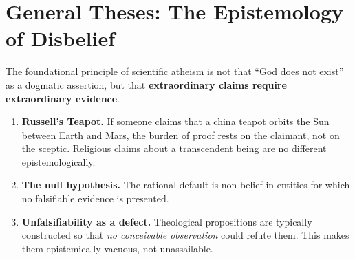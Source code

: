 \documentclass[11pt,twoside]{article}
\begin{document}
\newpage

\tableofcontents
\newpage

\section{General Theses: The Epistemology of Disbelief}

\begin{scheda}
The foundational principle of scientific atheism is not that ``God does not
exist'' as a dogmatic assertion, but that \textbf{extraordinary claims require
extraordinary evidence}.

\begin{enumerate}
  \item \textbf{Russell's Teapot.}
    If someone claims that a china teapot orbits the Sun between Earth and Mars,
    the burden of proof rests on the claimant, not on the sceptic.  Religious
    claims about a transcendent being are no different epistemologically.
  \item \textbf{The null hypothesis.}
    The rational default is non-belief in entities for which no falsifiable
    evidence is presented.
  \item \textbf{Unfalsifiability as a defect.}
    Theological propositions are typically constructed so that \emph{no
    conceivable observation} could refute them.  This makes them
    epistemically vacuous, not unassailable.
\end{enumerate}
\end{scheda}
\end{document}
